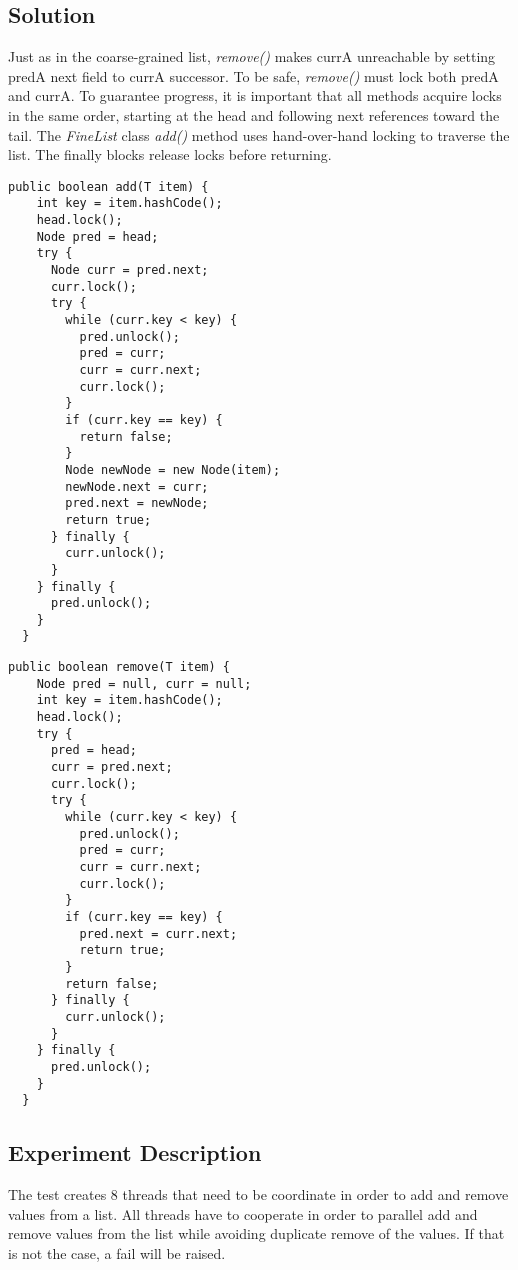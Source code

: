 \subsection{Solution}
\par
Just as in the coarse-grained list, \textit{remove()} makes currA unreachable by setting predA next field to currA successor. To be safe, \textit{remove()} must lock both predA and currA. To guarantee progress, it is important that all methods acquire locks in the same order, starting at the head and following next references toward the tail.
The \textit{FineList} class \textit{add()} method uses hand-over-hand locking to traverse the list. The finally blocks release locks before returning. 
\par
\begin{lstlisting}[frame=single,breaklines=true]
  public boolean add(T item) {
    int key = item.hashCode();
    head.lock();
    Node pred = head;
    try {
      Node curr = pred.next;
      curr.lock();
      try {
        while (curr.key < key) {
          pred.unlock();
          pred = curr;
          curr = curr.next;
          curr.lock();
        }
        if (curr.key == key) {
          return false;
        }
        Node newNode = new Node(item);
        newNode.next = curr;
        pred.next = newNode;
        return true;
      } finally {
        curr.unlock();
      }
    } finally {
      pred.unlock();
    }
  }
\end{lstlisting}
\begin{lstlisting}[frame=single,breaklines=true]
  public boolean remove(T item) {
    Node pred = null, curr = null;
    int key = item.hashCode();
    head.lock();
    try {
      pred = head;
      curr = pred.next;
      curr.lock();
      try {
        while (curr.key < key) {
          pred.unlock();
          pred = curr;
          curr = curr.next;
          curr.lock();
        }
        if (curr.key == key) {
          pred.next = curr.next;
          return true;
        }
        return false;
      } finally {
        curr.unlock();
      }
    } finally {
      pred.unlock();
    }
  }
\end{lstlisting}


\subsection{Experiment Description} 
\par
The test creates $8$ threads that need to be coordinate in order to add and remove values from a list. All threads have to cooperate in order to parallel add and remove values from the list while avoiding duplicate remove of the values.
If that is not the case, a fail will be raised.
\par


